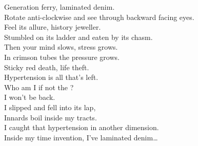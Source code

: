 Generation ferry, laminated denim. \\
Rotate anti-clockwise and see through backward facing eyes. \\
Feel its allure, history jeweller. \\
Stumbled on its ladder and eaten by its chasm. \\

Then your mind slows, stress grows. \\
In crimson tubes the pressure grows. \\
Sticky red death, life theft. \\
Hypertension is all that's left. \\

Who am I if not the ? \\
I won't be back. \\
I slipped and fell into its lap, \\
Innards boil inside my tracts. \\

I caught that hypertension in another dimension. \\
Inside my time invention, I've laminated denim… \\
